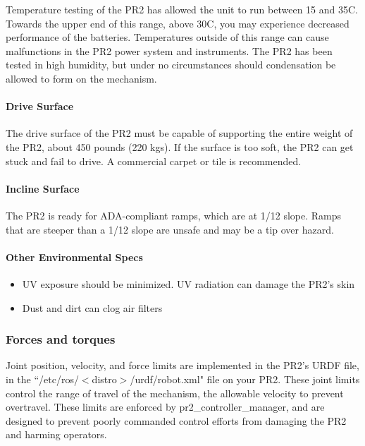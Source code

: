 Temperature testing of the PR2 has allowed the unit to run between 15 and
35C. Towards the upper end of this range, above 30C, you may experience decreased performance of the batteries. Temperatures outside of this range can cause malfunctions in the PR2 power system and instruments. The PR2 has been tested in high humidity, but under no
circumstances should condensation be allowed to form on the mechanism.

\paragraph{Drive Surface}

The drive surface of the PR2 must be capable of supporting the entire weight of
the PR2, about 450 pounds (220 kgs). If the surface is too soft, the PR2 can get
stuck and fail to drive. A commercial carpet or tile is recommended.

\paragraph{Incline Surface}

The PR2 is ready for ADA-compliant ramps, which are at 1/12 slope. Ramps that
are steeper than a 1/12 slope are unsafe and may be a tip over hazard.

\paragraph{Other Environmental Specs}

\begin{itemize}
\item UV exposure should be minimized. UV radiation can damage the PR2's skin
\item Dust and dirt can clog air filters
\end{itemize}

\subsubsection{Forces and torques}

Joint position, velocity, and force limits are implemented in the PR2's URDF
file, in the ``/etc/ros/$<$distro$>$/urdf/robot.xml" file on your PR2. These joint limits
control the range of travel of the mechanism, the allowable velocity to prevent
overtravel. These limits are enforced by pr2\_controller\_manager, and are
designed to prevent poorly commanded control efforts from damaging the PR2 and
harming operators.

